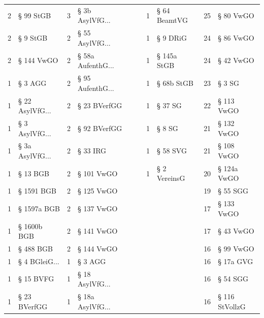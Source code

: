 \begin{tabular}{rlrlllllrl}
         2 &         § 99 StGB &           3 &   § 3b AsylVfG... &            &               &          1 &        § 64 BeamtVG &         25 &      § 80 VwGO \\
         2 &          § 9 StGB &           2 &   § 55 AsylVfG... &            &               &          1 &            § 9 DRiG &         24 &      § 86 VwGO \\
         2 &        § 144 VwGO &           2 & § 58a AufenthG... &            &               &          1 &         § 145a StGB &         24 &      § 42 VwGO \\
         1 &           § 3 AGG &           2 &  § 95 AufenthG... &            &               &          1 &          § 68b StGB &         23 &         § 3 SG \\
         1 & § 22 AsylVfG... &           2 &        § 23 BVerfGG &            &               &          1 &             § 37 SG &         22 &     § 113 VwGO \\
         1 &  § 3 AsylVfG... &           2 &        § 92 BVerfGG &            &               &          1 &              § 8 SG &         21 &     § 132 VwGO \\
         1 & § 3a AsylVfG... &           2 &            § 33 IRG &            &               &          1 &            § 58 SVG &         21 &     § 108 VwGO \\
         1 &          § 13 BGB &           2 &          § 101 VwGO &            &               &          1 &        § 2 VereinsG &         20 &    § 124a VwGO \\
         1 &        § 1591 BGB &           2 &          § 125 VwGO &            &               &            &                     &         19 &       § 55 SGG \\
         1 &       § 1597a BGB &           2 &          § 137 VwGO &            &               &            &                     &         17 &     § 133 VwGO \\
         1 &       § 1600b BGB &           2 &          § 141 VwGO &            &               &            &                     &         17 &      § 43 VwGO \\
         1 &         § 488 BGB &           2 &          § 144 VwGO &            &               &            &                     &         16 &      § 99 VwGO \\
         1 &   § 4 BGleiG... &           1 &             § 3 AGG &            &               &            &                     &         16 &      § 17a GVG \\
         1 &         § 15 BVFG &           1 &   § 18 AsylVfG... &            &               &            &                     &         16 &       § 54 SGG \\
         1 &      § 23 BVerfGG &           1 &  § 18a AsylVfG... &            &               &            &                     &         16 & § 116 StVollzG \\
\bottomrule
\end{tabular}

\